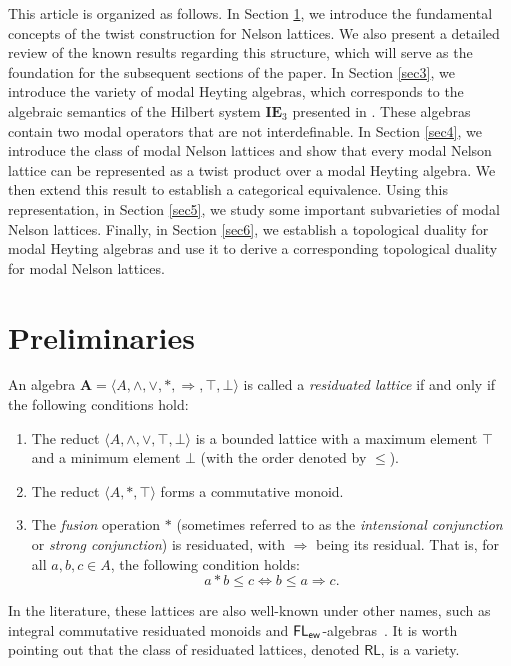\documentclass[pdflatex,sn-mathphys-num]{sn-jnl}%
\newcommand{\A}{\mathbf{A}}
\newcommand{\var}[1]{\mathsf{#1}}
\newcommand{\To}{\Rightarrow}
\theoremstyle{thmstyleone}%
\theoremstyle{thmstyletwo}%
\theoremstyle{thmstylethree}%
\begin{document}
This article is organized as follows. In Section \ref{sec2}, we introduce the fundamental concepts of the twist construction for Nelson lattices. We also present a detailed review of the known results regarding this structure, which will serve as the foundation for the subsequent sections of the paper. In Section \ref{sec3}, we introduce the variety of modal Heyting algebras, which corresponds to the algebraic semantics of the Hilbert system $\textbf{IE}_3$ presented in \cite[Section 4.2]{Oli2020}. These algebras contain two modal operators that are not interdefinable. In Section \ref{sec4}, we introduce the class of modal Nelson lattices and show that every modal Nelson lattice can be represented as a twist product over a modal Heyting algebra. We then extend this result to establish a categorical equivalence. Using this representation, in Section \ref{sec5}, we study some important subvarieties of modal Nelson lattices. Finally, in Section \ref{sec6}, we establish a topological duality for modal Heyting algebras and use it to derive a corresponding topological duality for modal Nelson lattices.


\section{Preliminaries}\label{sec2}
An algebra $\A = \langle A, \wedge, \vee, *, \To, \top, \bot \rangle$ is called a \emph{residuated lattice} if and only if the following conditions hold:
\begin{enumerate}
    \item The reduct $\langle A, \wedge, \vee, \top, \bot \rangle$ is a bounded lattice with a maximum element $\top$ and a minimum element $\bot$ (with the order denoted by $\leq$).
    \item The reduct $\langle A, *, \top \rangle$ forms a commutative monoid.
    \item The \emph{fusion} operation $*$ (sometimes referred to as the \emph{intensional conjunction} or \emph{strong conjunction}) is residuated, with $\To$ being its residual. That is, for all $a, b, c \in A$, the following condition holds:
    \begin{equation}
    a * b \leq c \iff b\leq a \To c.
    \label{res}
    \end{equation}
\end{enumerate}
In the literature, these lattices are also well-known under other names, such as integral commutative residuated monoids and $\sf{FL_{ew}}$-algebras~\cite{Hoh95, JipTsi02, Ono03}. It is worth pointing out that the class of residuated lattices, denoted $\var{RL}$, is a variety. 
\end{document}
